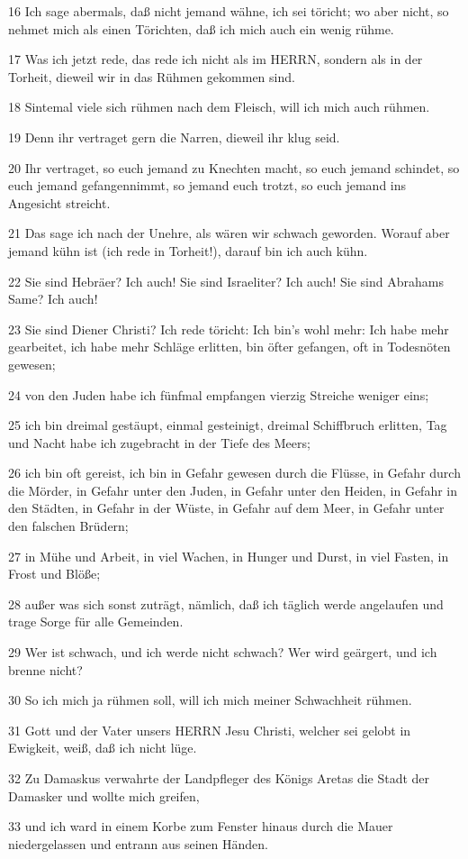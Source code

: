 \par 16 Ich sage abermals, daß nicht jemand wähne, ich sei töricht; wo aber nicht, so nehmet mich als einen Törichten, daß ich mich auch ein wenig rühme.
\par 17 Was ich jetzt rede, das rede ich nicht als im HERRN, sondern als in der Torheit, dieweil wir in das Rühmen gekommen sind.
\par 18 Sintemal viele sich rühmen nach dem Fleisch, will ich mich auch rühmen.
\par 19 Denn ihr vertraget gern die Narren, dieweil ihr klug seid.
\par 20 Ihr vertraget, so euch jemand zu Knechten macht, so euch jemand schindet, so euch jemand gefangennimmt, so jemand euch trotzt, so euch jemand ins Angesicht streicht.
\par 21 Das sage ich nach der Unehre, als wären wir schwach geworden. Worauf aber jemand kühn ist (ich rede in Torheit!), darauf bin ich auch kühn.
\par 22 Sie sind Hebräer? Ich auch! Sie sind Israeliter? Ich auch! Sie sind Abrahams Same? Ich auch!
\par 23 Sie sind Diener Christi? Ich rede töricht: Ich bin's wohl mehr: Ich habe mehr gearbeitet, ich habe mehr Schläge erlitten, bin öfter gefangen, oft in Todesnöten gewesen;
\par 24 von den Juden habe ich fünfmal empfangen vierzig Streiche weniger eins;
\par 25 ich bin dreimal gestäupt, einmal gesteinigt, dreimal Schiffbruch erlitten, Tag und Nacht habe ich zugebracht in der Tiefe des Meers;
\par 26 ich bin oft gereist, ich bin in Gefahr gewesen durch die Flüsse, in Gefahr durch die Mörder, in Gefahr unter den Juden, in Gefahr unter den Heiden, in Gefahr in den Städten, in Gefahr in der Wüste, in Gefahr auf dem Meer, in Gefahr unter den falschen Brüdern;
\par 27 in Mühe und Arbeit, in viel Wachen, in Hunger und Durst, in viel Fasten, in Frost und Blöße;
\par 28 außer was sich sonst zuträgt, nämlich, daß ich täglich werde angelaufen und trage Sorge für alle Gemeinden.
\par 29 Wer ist schwach, und ich werde nicht schwach? Wer wird geärgert, und ich brenne nicht?
\par 30 So ich mich ja rühmen soll, will ich mich meiner Schwachheit rühmen.
\par 31 Gott und der Vater unsers HERRN Jesu Christi, welcher sei gelobt in Ewigkeit, weiß, daß ich nicht lüge.
\par 32 Zu Damaskus verwahrte der Landpfleger des Königs Aretas die Stadt der Damasker und wollte mich greifen,
\par 33 und ich ward in einem Korbe zum Fenster hinaus durch die Mauer niedergelassen und entrann aus seinen Händen.

